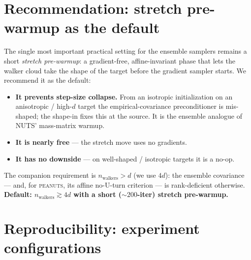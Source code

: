 \documentclass[11pt]{article}
\begin{document}
\section{Recommendation: stretch pre-warmup as the default}
\label{sec:ws}

The single most important practical setting for the ensemble samplers remains
a short \emph{stretch pre-warmup}: a gradient-free, affine-invariant phase that
lets the walker cloud take the shape of the target before the gradient sampler
starts. We recommend it as the default:
\begin{itemize}\setlength\itemsep{2pt}
\item \textbf{It prevents step-size collapse.} From an isotropic
initialization on an anisotropic / high-$d$ target the empirical-covariance
preconditioner is mis-shaped; the shape-in fixes this at the source. It is the
ensemble analogue of NUTS' mass-matrix warmup.
\item \textbf{It is nearly free} --- the stretch move uses no gradients.
\item \textbf{It has no downside} --- on well-shaped / isotropic targets it is
a no-op.
\end{itemize}
The companion requirement is $n_{\text{walkers}}\!>\!d$ (we use $4d$): the
ensemble covariance --- and, for \textsc{peanuts}, its affine no-U-turn
criterion --- is rank-deficient otherwise. \textbf{Default:
$n_{\text{walkers}}\!\gtrsim\!4d$ with a short ($\sim\!200$-iter) stretch
pre-warmup.}

\section{Reproducibility: experiment configurations}
\label{sec:repro}
\end{document}
